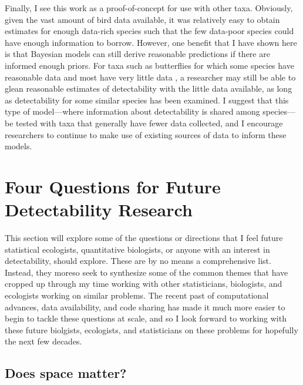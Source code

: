 \par Finally, I see this work as a proof-of-concept for use with other taxa.
Obviously, given the vast amount of bird data available, it was relatively easy to obtain estimates for enough data-rich species such that the few data-poor species could have enough information to borrow. 
However, one benefit that I have shown here is that Bayesian models can still derive reasonable predictions if there are informed enough priors.
For taxa such as butterflies for which some species have reasonable data and most have very little data \citep{lewthwaite_geographical_2022}, a researcher may still be able to glean reasonable estimates of detectability with the little data available, as long as detectability for some similar species has been examined.
I suggest that this type of model---where information about detectability is shared among species---be tested with taxa that generally have fewer data collected, and I encourage researchers to continue to make use of existing sources of data \citep{binley_minimizing_2023} to inform these models.

\section{Four Questions for Future Detectability Research}

\par This section will explore some of the questions or directions that I feel future statistical ecologists, quantitative biologists, or anyone with an interest in detectability, should explore.
These are by no means a comprehensive list.
Instead, they moreso seek to synthesize some of the common themes that have cropped up through my time working with other statisticians, biologists, and ecologists working on similar problems.
The recent past of computational advances, data availability, and code sharing has made it much more easier to begin to tackle these questions at scale, and so I look forward to working with these future biolgists, ecologists, and statisticians on these problems for hopefully the next few decades.

\subsection{Does space matter?}

